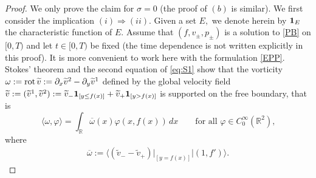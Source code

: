 \documentclass[11pt,reqno]{amsart}
\numberwithin{equation}{section}
\newcommand{\0}{\Omega}
\newcommand{\p}{\partial}
\newcommand{\wt}{\widetilde}
\newcommand{\ov}{\overline}
\newcommand{\R}{\mathbb{R}}
\numberwithin{equation}{section}
\begin{document}
\begin{proof}
We only  prove the claim for $\sigma=0$ (the proof of $(b)$ is similar). 
We first  consider  the implication $(i)\Rightarrow (ii)$. Given a set $E,$ we denote herein by ${\bf 1}_E$ the characteristic function of $E$.  
Assume that $(f,v_\pm,p_\pm)$ is a solution to \eqref{PB}  on $[0,T)$ and let  $t\in[0,T)$ be fixed (the time dependence is not written explicitly in  this proof).
It is more convenient   to work here with the formulation \eqref{EPP}. 
 Stokes' theorem   and the second equation of \eqref{eq:S1}  show  that the vorticity  $\omega:={\rm rot\,} \wt v:=\p_x\wt v^2-\p_y\wt v^1 $ defined by the global  velocity field   
 $\wt v:=(\wt v^1,\wt v^2):=\wt v_-{\bf 1}_{[y\leq f(x)]}+\wt v_+{\bf 1}_{[y> f(x)]}$
 is supported on the free boundary, that is 
\[\langle \omega,\varphi\rangle=  \int_\R\ov\omega(x)\varphi(x,f(x))\, dx\qquad\text{for all $\varphi\in C^\infty_0(\R^2)$,}\]
where
\begin{align}\label{vor}
 \ov\omega:= \big\langle(\wt v_- -\wt v_+)|_{[y=f(x)]}\big| (1,f')\big\rangle.
\end{align}



\end{proof}
\end{document}
